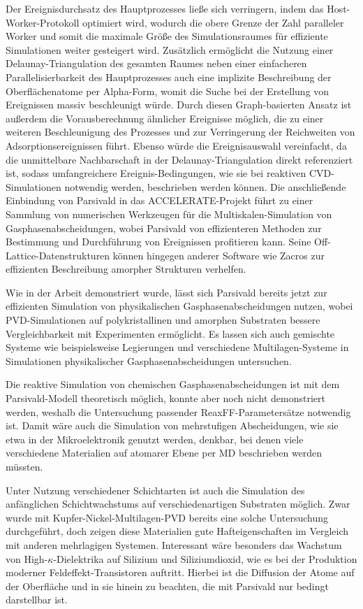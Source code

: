 Der Ereignisdurchsatz des Hauptprozesses ließe sich verringern, indem das Host-Worker-Protokoll optimiert wird, wodurch die obere Grenze der Zahl paralleler Worker und somit die maximale Größe des Simulationsraumes für effiziente Simulationen weiter gesteigert wird.
Zusätzlich ermöglicht die Nutzung einer Delaunay-Triangulation des gesamten Raumes neben einer einfacheren Parallelisierbarkeit des Hauptprozesses auch eine implizite Beschreibung der Oberflächenatome per Alpha-Form, womit die Suche bei der Erstellung von Ereignissen massiv beschleunigt würde.
Durch diesen Graph-basierten Ansatz ist außerdem die Vorausberechnung ähnlicher Ereignisse möglich, die zu einer weiteren Beschleunigung des Prozesses und zur Verringerung der Reichweiten von Adsorptionsereignissen führt.
Ebenso würde die Ereignisauswahl vereinfacht, da die unmittelbare Nachbarschaft in der Delaunay-Triangulation direkt referenziert ist, sodass umfangreichere Ereignis-Bedingungen, wie sie bei reaktiven CVD-Simulationen notwendig werden, beschrieben werden können.
Die anschließende Einbindung von Parsivald in das ACCELERATE-Projekt führt zu einer Sammlung von numerischen Werkzeugen für die Multiskalen-Simulation von Gasphasenabscheidungen, wobei Parsivald von effizienteren Methoden zur Bestimmung und Durchführung von Ereignissen profitieren kann.
Seine Off-Lattice-Datenstrukturen können hingegen anderer Software wie Zacros\cite{stamatakis_zacros_2014} zur effizienten Beschreibung amorpher Strukturen verhelfen.

Wie in der Arbeit demonstriert wurde, lässt sich Parsivald bereits jetzt zur effizienten Simulation von physikalischen Gasphasenabscheidungen nutzen, wobei PVD-Simulationen auf polykristallinen und amorphen Substraten bessere Vergleichbarkeit mit Experimenten ermöglicht\cite{adamov_electrical_1974}.
Es lassen sich auch gemischte Systeme wie beispielsweise Legierungen und verschiedene Multilagen-Systeme in Simulationen physikalischer Gasphasenabscheidungen untersuchen.

Die reaktive Simulation von chemischen Gasphasenabscheidungen ist mit dem Parsivald-Modell theoretisch möglich, konnte aber noch nicht demonstriert werden, weshalb die Untersuchung passender ReaxFF-Parametersätze notwendig ist.
Damit wäre auch die Simulation von mehrstufigen Abscheidungen, wie sie etwa in der Mikroelektronik genutzt werden\cite{granneman_thin_1993}, denkbar, bei denen viele verschiedene Materialien auf atomarer Ebene per MD beschrieben werden müssten.

Unter Nutzung verschiedener Schichtarten ist auch die Simulation des anfänglichen Schichtwachstums auf verschiedenartigen Substraten möglich.
Zwar wurde mit Kupfer-Nickel-Multi\-lagen-PVD bereits eine solche Untersuchung durchgeführt, doch zeigen diese Materialien gute Hafteigenschaften im Vergleich mit anderen mehrlagigen Systemen.
Interessant wäre besonders das Wachstum von High-$\kappa$-Dielektrika auf Silizium und Siliziumdioxid, wie es bei der Produktion moderner Feldeffekt-Transistoren auftritt.
Hierbei ist die Diffusion der Atome auf der Oberfläche und in sie hinein zu beachten, die mit Parsivald nur bedingt darstellbar ist.
